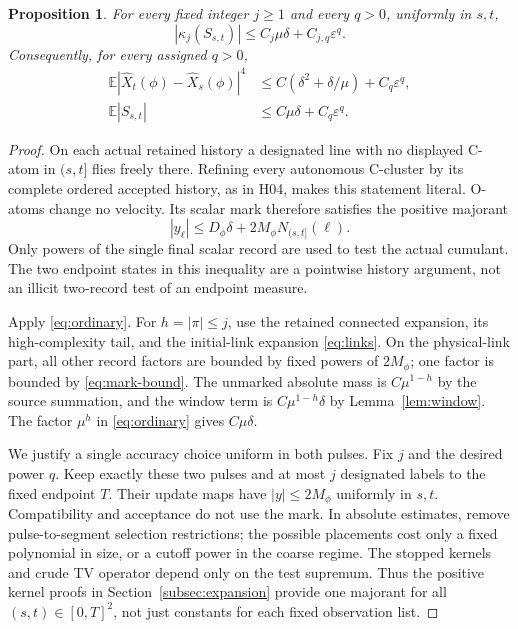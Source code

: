 \documentclass[11pt]{article}
\newcommand{\E}{\mathbb E}
\newcommand{\eps}{\varepsilon}
\newtheorem{proposition}[theorem]{Proposition}
\theoremstyle{definition}\newtheorem{definition}[theorem]{Definition}
\theoremstyle{remark}\newtheorem{remark}[theorem]{Remark}
\numberwithin{equation}{section}
\begin{document}
\begin{proposition}\label{prop:increments}
For every fixed integer $j\ge1$ and every $q>0$, uniformly in $s,t$,
\begin{equation}\label{eq:cumulant-bound}
 |\kappa_j(S_{s,t})|\le C_j\mu\delta+C_{j,q}\eps^q.
\end{equation}
Consequently, for every assigned $q>0$,
\begin{align}
 \E|\widehat X_t(\phi)-\widehat X_s(\phi)|^4
     &\le C(\delta^2+\delta/\mu)+C_q\eps^q,\label{eq:fourth}\\
 \E|S_{s,t}|&\le C\mu\delta+C_q\eps^q.\label{eq:absolute-increment}
\end{align}
\end{proposition}
\begin{proof}
On each actual retained history a designated line with no displayed C-atom
in $(s,t]$ flies freely there. Refining every autonomous C-cluster by its
complete ordered accepted history, as in H04, makes this statement literal.
O-atoms change no velocity. Its scalar mark therefore satisfies the positive
majorant
\begin{equation}\label{eq:mark-bound}
 |y_\ell|\le D_\phi\delta+2M_\phi N_{(s,t]}(\ell).
\end{equation}
Only powers of the single final scalar record are used to test the actual
cumulant. The two endpoint states in this inequality are a pointwise
history argument, not an illicit two-record test of an endpoint measure.

Apply \eqref{eq:ordinary}. For $h=|\pi|\le j$, use the retained connected
expansion, its high-complexity tail, and the initial-link expansion
\eqref{eq:links}. On the physical-link part, all other record factors are
bounded by fixed powers of $2M_\phi$; one factor is bounded by
\eqref{eq:mark-bound}. The unmarked absolute mass is
$C\mu^{1-h}$ by the source summation, and the window term is
$C\mu^{1-h}\delta$ by Lemma~\ref{lem:window}. The factor $\mu^h$ in
\eqref{eq:ordinary} gives $C\mu\delta$.

We justify a single accuracy choice uniform in both pulses. Fix $j$ and the
desired power $q$. Keep exactly these two pulses and at most $j$ designated
labels to the fixed endpoint $T$. Their update maps have
$|y|\le2M_\phi$ uniformly in $s,t$. Compatibility and acceptance do not
use the mark. In absolute estimates, remove pulse-to-segment selection
restrictions; the possible placements cost only a fixed polynomial in size,
or a cutoff power in the coarse regime. The stopped kernels and crude TV
operator depend only on the test supremum. Thus the positive kernel proofs
in Section~\ref{subsec:expansion} provide one majorant for all
$(s,t)\in[0,T]^2$, not just constants for each fixed observation list.


\end{proof}
\end{document}
